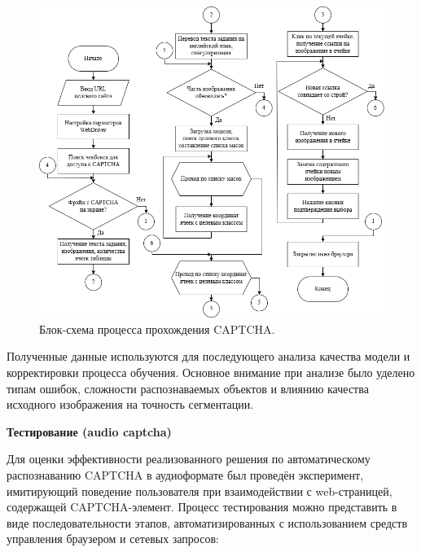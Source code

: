 \begin{figure}[H]
    \centering
    \includegraphics[width=1\textwidth]{imgs/imagecaptcha/solve_captcha_flow.png}
    \caption{Блок-схема процесса прохождения CAPTCHA.}
    \label{fig:solve-captcha}
\end{figure}
\vspace{-0.5cm}

Полученные данные используются для последующего анализа качества модели и 
корректировки процесса обучения. Основное внимание при анализе было уделено 
типам ошибок, сложности распознаваемых объектов и влиянию качества исходного 
изображения на точность сегментации.

\textbf{Тестирование (audio captcha)}

Для оценки эффективности реализованного решения по автоматическому распознаванию 
CAPTCHA в аудиоформате был проведён эксперимент, имитирующий поведение 
пользователя при взаимодействии с web-страницей, содержащей CAPTCHA-элемент. 
Процесс тестирования можно представить в виде последовательности этапов, 
автоматизированных с использованием средств управления браузером и сетевых 
запросов:

